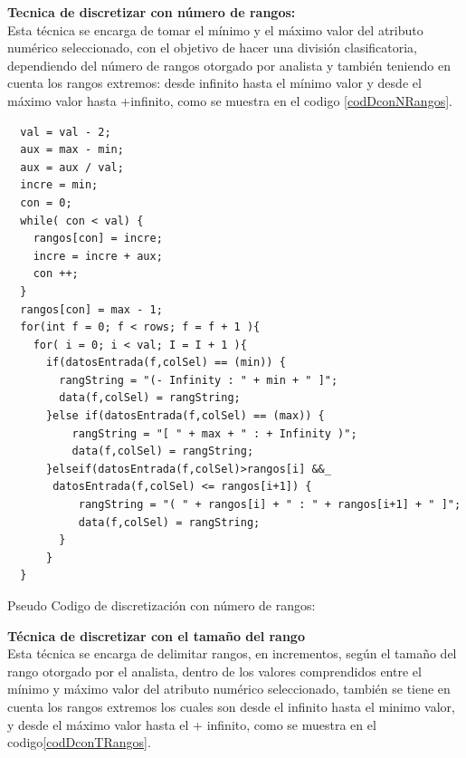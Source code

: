 \textbf{Tecnica de discretizar con n\'umero de rangos:} \\ 
Esta t\'ecnica se encarga de tomar el m\'inimo y el m\'aximo valor del atributo num\'erico seleccionado, con el objetivo de hacer una divisi\'on clasificatoria,  dependiendo del n\'umero de rangos otorgado por analista y tambi\'en teniendo en cuenta los rangos extremos: desde \-infinito hasta el m\'inimo valor y desde el m\'aximo valor hasta +infinito, como se muestra en el codigo \ref{codDconNRangos}. \\
 
\begin{codigof}[!h]
\fontsize{9}{2}
\begin{verbatim} 
  val = val - 2;    
  aux = max - min;
  aux = aux / val;
  incre = min;  
  con = 0;
  while( con < val) {
    rangos[con] = incre;
    incre = incre + aux;
    con ++;
  }
  rangos[con] = max - 1;
  for(int f = 0; f < rows; f = f + 1 ){ 
    for( i = 0; i < val; I = I + 1 ){
      if(datosEntrada(f,colSel) == (min)) {
        rangString = "(- Infinity : " + min + " ]"; 
        data(f,colSel) = rangString;
      }else if(datosEntrada(f,colSel) == (max)) {
          rangString = "[ " + max + " : + Infinity )"; 
          data(f,colSel) = rangString;
      }elseif(datosEntrada(f,colSel)>rangos[i] &&_
       datosEntrada(f,colSel) <= rangos[i+1]) { 
           rangString = "( " + rangos[i] + " : " + rangos[i+1] + " ]"; 
           data(f,colSel) = rangString;
        }
      }
  } 
\end{verbatim}
\caption{Pseudo Codigo de discretizaci\'on con n\'umero de rangos:}
\label{codDconNRangos}
\end{codigof}


\textbf{T\'ecnica de discretizar con el tama\~no del rango} \\        
Esta t\'ecnica se encarga de  delimitar rangos, en incrementos, seg\'un el tama\~no del rango otorgado por el analista, dentro de los valores comprendidos entre el m\'inimo y m\'aximo valor del atributo num\'erico seleccionado, tambi\'en se tiene en cuenta los rangos extremos los cuales son desde el \-infinito hasta el minimo valor, y desde el m\'aximo valor hasta el + infinito, como se muestra en el codigo\ref{codDconTRangos}. \\
 
